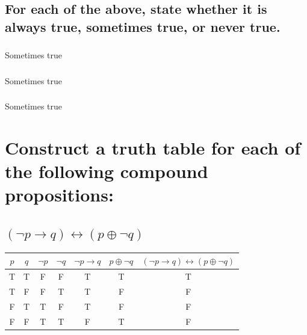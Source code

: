 \documentclass{article}
\begin{document}
    \subsection{For each of the above, state whether it is always true, sometimes true, or never true.} 
        \subsubsection{}Sometimes true
        \subsubsection{}Sometimes true
        \subsubsection{}Sometimes true

\section{Construct a truth table for each of the following compound propositions:}
    \subsection{\texorpdfstring{$(\neg p \to q) \leftrightarrow (p \oplus \neg q)$}{(¬p → q) ↔ (p ⊕ ¬q)}}
        \begin{center}
            \begin{tabular}{|c|c|c|c|c|c|c|}
                \hline
                $p$ & $q$ & $\neg p$& $\neg q$ & $\neg p \to q$ & $p \oplus \neg q$ & $(\neg p \to q) \leftrightarrow (p \oplus \neg q)$ \\
                \hline
                T & T & F & F & T & T & T \\
                T & F & F & T & T & F & F \\
                F & T & T & F & T & F & F \\
                F & F & T & T & F & T & F \\
                \hline
            \end{tabular}
        \end{center}
\end{document}
